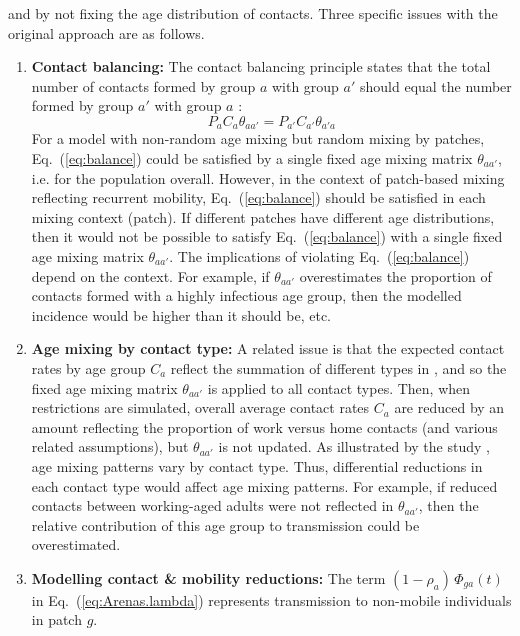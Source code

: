 and by not fixing the age distribution of contacts.
Three specific issues with the original approach are as follows.
\begin{enumerate}
  \item \textbf{Contact balancing:}\label{issue:balance}
  The contact balancing principle states that
  the total number of contacts formed by group $a$ with group $a'$
  should equal the number formed by group $a'$ with group $a$ \cite{Arregui2018}:
  \begin{equation}\label{eq:balance}
    P_{a} C_{a} \theta_{aa'} = P_{a'} C_{a'} \theta_{a'a}
  \end{equation}
  For a model with non-random age mixing but random mixing by patches,
  Eq.~(\ref{eq:balance}) could be satisfied by a single fixed age mixing matrix $\theta_{aa'}$,
  i.e. for the population overall.
  However, in the context of patch-based mixing reflecting recurrent mobility,
  Eq.~(\ref{eq:balance}) should be satisfied in each mixing context (patch).
  If different patches have different age distributions,
  then it would not be possible to satisfy Eq.~(\ref{eq:balance})
  with a single fixed age mixing matrix $\theta_{aa'}$.
  The implications of violating Eq.~(\ref{eq:balance}) depend on the context.
  For example, if $\theta_{aa'}$ overestimates
  the proportion of contacts formed with a highly infectious age group,
  then the modelled incidence would be higher than it should be, etc.
  \item \textbf{Age mixing by contact type:}\label{issue:age-mix}
  A related issue is that the expected contact rates by age group $C_a$ reflect
  the summation of different types in \cite{Arenas2020},
  and so the fixed age mixing matrix $\theta_{aa'}$ is applied to all contact types.
  Then, when restrictions are simulated, overall average contact rates $C_a$ are reduced
  by an amount reflecting the proportion of work versus home contacts
  (and various related assumptions), but $\theta_{aa'}$ is not updated.
  As illustrated by the \polymod study \cite{Mossong2008}, age mixing patterns vary by contact type.
  Thus, differential reductions in each contact type would affect age mixing patterns.
  For example, if reduced contacts between working-aged adults were not reflected in $\theta_{aa'}$,
  then the relative contribution of this age group to transmission could be overestimated.
  \item \textbf{Modelling contact \& mobility reductions:}\label{issue:mobility}
  The term $(1-\rho_a)\,\Phi_{ga}(t)$ in Eq.~(\ref{eq:Arenas.lambda})
  represents transmission to non-mobile individuals in patch $g$.  

\end{enumerate}

